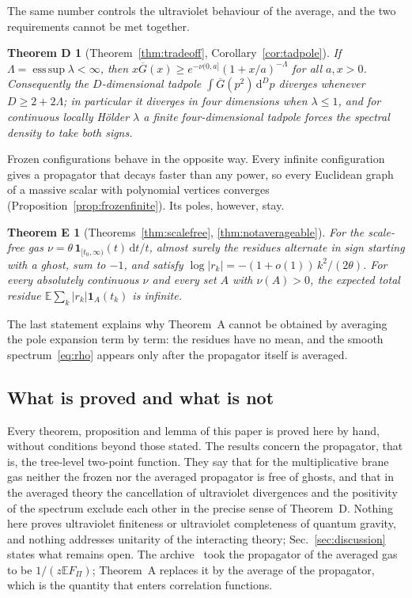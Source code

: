 \documentclass[aps,prd,twocolumn,superscriptaddress,nofootinbib,longbibliography,floatfix,amsmath,amssymb,10pt]{revtex4-2}
\newtheorem*{theoremD}{Theorem D}
\newtheorem*{theoremE}{Theorem E}
\theoremstyle{definition}
\theoremstyle{remark}
\newcommand{\E}{\mathbb{E}}
\newcommand{\Gbar}{\overline{G}}
\newcommand{\dd}{\mathrm{d}}
\DeclareMathOperator*{\esssup}{ess\,sup}
\begin{document}
The same number controls the ultraviolet behaviour of the average, and the
two requirements cannot be met together.

\begin{theoremD}[Theorem~\ref{thm:tradeoff}, Corollary~\ref{cor:tadpole}]
If $\Lambda=\esssup\lambda<\infty$, then $x\Gbar(x)\ge
e^{-\nu(0,a]}(1+x/a)^{-\Lambda}$ for all $a,x>0$. Consequently the
$D$-dimensional tadpole $\int\Gbar(p^2)\,\dd^Dp$ diverges whenever
$D\ge2+2\Lambda$; in particular it diverges in four dimensions when
$\lambda\le1$, and for continuous locally H\"older $\lambda$ a finite
four-dimensional tadpole forces the spectral density to take both signs.
\end{theoremD}

Frozen configurations behave in the opposite way. Every infinite
configuration gives a propagator that decays faster than any power, so every
Euclidean graph of a massive scalar with polynomial vertices converges
(Proposition~\ref{prop:frozenfinite}). Its poles, however, stay.

\begin{theoremE}[Theorems~\ref{thm:scalefree}, \ref{thm:notaverageable}]
For the scale-free gas $\nu=\theta\,\mathbf 1_{[t_0,\infty)}(t)\,\dd t/t$,
almost surely the residues alternate in sign starting with a ghost, sum to
$-1$, and satisfy $\log|r_k|=-(1+o(1))\,k^2/(2\theta)$. For every
absolutely continuous $\nu$ and every set $A$ with $\nu(A)>0$, the expected
total residue $\E\sum_k|r_k|\mathbf 1_A(t_k)$ is infinite.
\end{theoremE}

The last statement explains why Theorem~A cannot be obtained by averaging the
pole expansion term by term: the residues have no mean, and the smooth
spectrum~\eqref{eq:rho} appears only after the propagator itself is averaged.

\subsection{What is proved and what is not}

Every theorem, proposition and lemma of this paper is proved here by hand,
without conditions beyond those stated. The results concern the propagator,
that is, the tree-level two-point function. They say that for the
multiplicative brane gas neither the frozen nor the averaged propagator is
free of ghosts, and that in the averaged theory the cancellation of
ultraviolet divergences and the positivity of the spectrum exclude each other
in the precise sense of Theorem~D. Nothing here proves ultraviolet finiteness
or ultraviolet completeness of quantum gravity, and nothing addresses
unitarity of the interacting theory; Sec.~\ref{sec:discussion} states what
remains open. The archive~\cite{BCGarchive} took the propagator of the
averaged gas to be $1/(z\E F_\Pi)$; Theorem~A replaces it by the average of
the propagator, which is the quantity that enters correlation functions.
\end{document}
